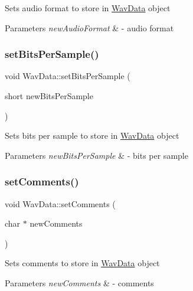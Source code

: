 Sets audio format to store in \hyperlink{classWavData}{Wav\+Data} object 
\begin{DoxyParams}{Parameters}
{\em new\+Audio\+Format} & -\/ audio format \\
\hline
\end{DoxyParams}
\mbox{\label{classWavData_a95eabeda93c6515bb0c4541935261678}} 
\subsubsection{\texorpdfstring{set\+Bits\+Per\+Sample()}{setBitsPerSample()}}
{\footnotesize\ttfamily void Wav\+Data\+::set\+Bits\+Per\+Sample (\begin{DoxyParamCaption}\item[{short}]{new\+Bits\+Per\+Sample }\end{DoxyParamCaption})}

Sets bits per sample to store in \hyperlink{classWavData}{Wav\+Data} object 
\begin{DoxyParams}{Parameters}
{\em new\+Bits\+Per\+Sample} & -\/ bits per sample \\
\hline
\end{DoxyParams}
\mbox{\label{classWavData_a14c2e941261877c65214dc49203a6016}} 
\subsubsection{\texorpdfstring{set\+Comments()}{setComments()}}
{\footnotesize\ttfamily void Wav\+Data\+::set\+Comments (\begin{DoxyParamCaption}\item[{char $\ast$}]{new\+Comments }\end{DoxyParamCaption})}

Sets comments to store in \hyperlink{classWavData}{Wav\+Data} object 
\begin{DoxyParams}{Parameters}
{\em new\+Comments} & -\/ comments \\
\hline
\end{DoxyParams}
\mbox{\label{classWavData_aa85a563a922b0dab8ec415d8a025a167}} 
